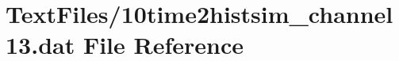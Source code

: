 \hypertarget{10time2histsim__channel13_8dat}{}\section{Text\+Files/10time2histsim\+\_\+channel13.dat File Reference}
\label{10time2histsim__channel13_8dat}
